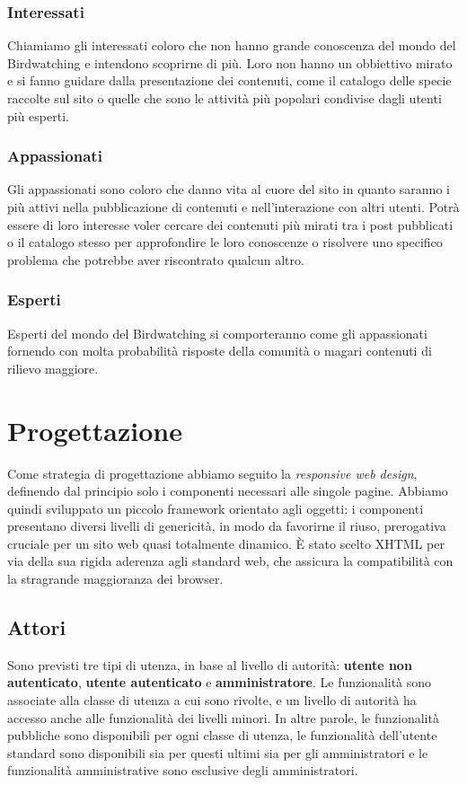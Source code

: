 \documentclass[12pt, a4paper]{article}
\begin{document}
    \subsubsection{Interessati}
    Chiamiamo gli interessati coloro che non hanno grande conoscenza del mondo del Birdwatching e intendono scoprirne di più.
    Loro non hanno un obbiettivo mirato e si fanno guidare dalla presentazione dei contenuti, come il catalogo delle specie
    raccolte sul sito o quelle che sono le attività più popolari condivise dagli utenti più esperti.
    \subsubsection{Appassionati}
    Gli appassionati sono coloro che danno vita al cuore del sito in quanto saranno i più attivi nella pubblicazione
    di contenuti e nell'interazione con altri utenti.
    Potrà essere di loro interesse voler cercare dei contenuti più mirati tra i post pubblicati o il catalogo stesso
    per approfondire le loro conoscenze o risolvere uno specifico problema che potrebbe aver riscontrato qualcun altro.
    
    \subsubsection{Esperti}
    Esperti del mondo del Birdwatching si comporteranno come gli appassionati fornendo con molta probabilità risposte
    della comunità o magari contenuti di rilievo maggiore.

    \section{Progettazione}
    Come strategia di progettazione abbiamo seguito la \textit{responsive web design}, definendo dal principio solo i componenti necessari alle singole pagine. Abbiamo quindi sviluppato un piccolo framework orientato agli oggetti: i componenti presentano diversi livelli di genericità, in modo da favorirne il riuso, prerogativa cruciale per un sito web quasi totalmente dinamico.
    È stato scelto XHTML per via della sua rigida aderenza agli standard web, che assicura la compatibilità con la stragrande maggioranza dei browser.
    \subsection{Attori}
    Sono previsti tre tipi di utenza, in base al livello di autorità: \textbf{utente non autenticato}, \textbf{utente autenticato} e \textbf{amministratore}. Le funzionalità sono associate alla classe di utenza a cui sono rivolte, e un livello di autorità ha accesso anche alle funzionalità dei livelli minori. In altre parole, le funzionalità pubbliche sono disponibili per ogni classe di utenza, le funzionalità dell'utente standard sono disponibili sia per questi ultimi sia per gli amministratori e le funzionalità amministrative sono esclusive degli amministratori.
\end{document}
